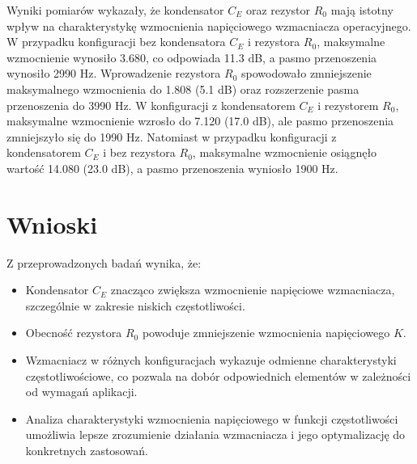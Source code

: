 \documentclass[11pt]{article}
\begin{document}



Wyniki pomiarów wykazały, że kondensator $C_E$ oraz rezystor $R_0$ mają istotny wpływ na charakterystykę wzmocnienia napięciowego wzmacniacza operacyjnego.
W przypadku konfiguracji bez kondensatora $C_E$ i rezystora $R_0$, maksymalne wzmocnienie wynosiło 3.680, co odpowiada 11.3 dB, a pasmo przenoszenia wynosiło 2990 Hz. Wprowadzenie rezystora $R_0$ spowodowało zmniejszenie maksymalnego wzmocnienia do 1.808 (5.1 dB) oraz rozszerzenie pasma przenoszenia do 3990 Hz.
W konfiguracji z kondensatorem $C_E$ i rezystorem $R_0$, maksymalne wzmocnienie wzrosło do 7.120 (17.0 dB), ale pasmo przenoszenia zmniejszyło się do 1990 Hz. Natomiast w przypadku konfiguracji z kondensatorem $C_E$ i bez rezystora $R_0$, maksymalne wzmocnienie osiągnęło wartość 14.080 (23.0 dB), a pasmo przenoszenia wyniosło 1900 Hz.

\section*{Wnioski}
Z przeprowadzonych badań wynika, że:
\begin{itemize}
    \item Kondensator $C_E$ znacząco zwiększa wzmocnienie napięciowe wzmacniacza, szczególnie w zakresie niskich częstotliwości.
    \item Obecność rezystora $R_0$ powoduje zmniejszenie wzmocnienia napięciowego $K$.
    \item Wzmacniacz w różnych konfiguracjach wykazuje odmienne charakterystyki częstotliwościowe, co pozwala na dobór odpowiednich elementów w zależności od wymagań aplikacji.
    \item Analiza charakterystyki wzmocnienia napięciowego w funkcji częstotliwości umożliwia lepsze zrozumienie działania wzmacniacza i jego optymalizację do konkretnych zastosowań.
\end{itemize}
\end{document}
